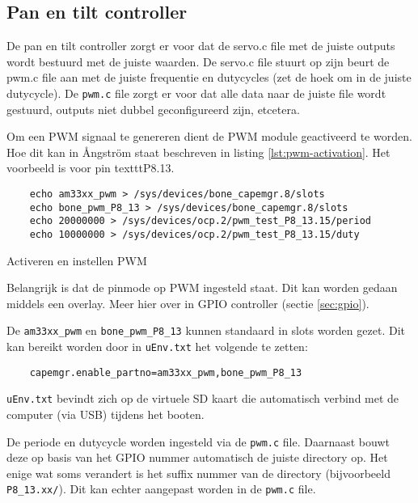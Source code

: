 \subsection{Pan en tilt controller}
\label{sec:pan-tilt-control}

De pan en tilt controller zorgt er voor dat de servo.c file met de juiste outputs
wordt bestuurd met de juiste waarden. De servo.c file stuurt op zijn beurt de pwm.c
file aan met de juiste frequentie en dutycycles (zet de hoek om in de juiste
dutycycle). De \texttt{pwm.c} file zorgt er voor dat alle data naar de juiste
file wordt gestuurd, outputs niet dubbel geconfigureerd zijn, etcetera.

Om een PWM signaal te genereren dient de PWM module geactiveerd te worden. Hoe
dit kan in Ångström staat beschreven in listing \ref{lst:pwm-activation}. Het
voorbeeld is voor pin texttt{P8.13}.

\begin{listing}
    \begin{verbatim}
    echo am33xx_pwm > /sys/devices/bone_capemgr.8/slots
    echo bone_pwm_P8_13 > /sys/devices/bone_capemgr.8/slots
    echo 20000000 > /sys/devices/ocp.2/pwm_test_P8_13.15/period
    echo 10000000 > /sys/devices/ocp.2/pwm_test_P8_13.15/duty
    \end{verbatim}
    \caption{Activeren en instellen PWM}
    \label{lst:pwm-activation}
\end{listing}


Belangrijk is dat de pinmode op PWM ingesteld staat. Dit kan worden gedaan
middels een overlay. Meer hier over in GPIO controller (sectie \ref{sec:gpio}).

De \texttt{am33xx\_pwm} en \texttt{bone\_pwm\_P8\_13} kunnen standaard in slots
worden gezet. Dit kan bereikt worden door in \texttt{uEnv.txt} het volgende te zetten:

\begin{verbatim}
    capemgr.enable_partno=am33xx_pwm,bone_pwm_P8_13
\end{verbatim}

\texttt{uEnv.txt} bevindt zich op de virtuele SD kaart die automatisch verbind
met de computer (via USB) tijdens het booten.

De periode en dutycycle worden ingesteld via de \texttt{pwm.c} file. Daarnaast
bouwt deze op basis van het GPIO nummer automatisch de juiste directory op. Het
enige wat soms verandert is het suffix nummer van de directory (bijvoorbeeld
\texttt{P8\_13.xx/}). Dit kan echter aangepast worden in de \texttt{pwm.c} file.
